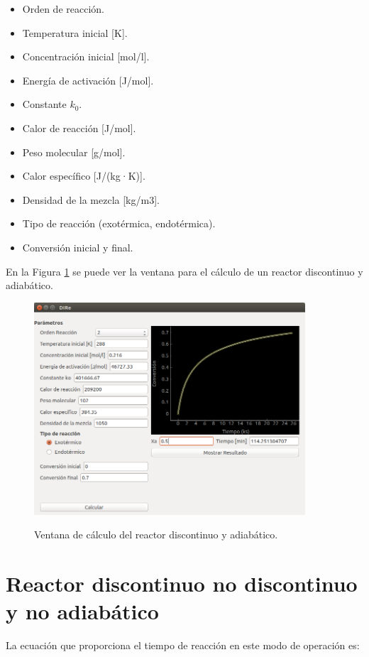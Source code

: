 	\begin{itemize}
		\item Orden de reacción.
		\item Temperatura inicial [K].
		\item Concentración inicial [mol/l].
		\item Energía de activación [J/mol].
		\item Constante $k_0$.
		\item Calor de reacción [J/mol].
		\item Peso molecular [g/mol].
		\item Calor específico [J/(kg·K)].
		\item Densidad de la mezcla [kg/m3].
		\item Tipo de reacción (exotérmica, endotérmica).
		\item Conversión inicial y final.
	\end{itemize}

	En la Figura \ref{dis_adi} se puede ver la ventana para el cálculo de un reactor discontinuo y adiabático.
	
	\begin{figure}[!h]
		\centering
		\includegraphics[width=0.9\textwidth]{./imagenes/reactor_discontinuo/adi.png}
		\label{dis_adi}
		\caption{Ventana de cálculo del reactor discontinuo y adiabático.}
	\end{figure}

	\section{Reactor discontinuo no discontinuo y no adiabático}
	La ecuación que proporciona el tiempo de reacción en este modo de operación es:
	
